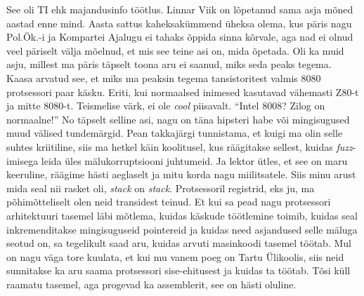 See oli TI ehk majandusinfo töötlus. Linnar Viik on lõpetanud sama asja mõned aastad enne mind. Aasta sattus kaheksakümmend üheksa olema, kus päris nagu Pol.Ök.-i ja Kompartei Ajalugu ei tahaks õppida sinna kõrvale, aga nad ei olnud veel päriselt välja mõelnud, et mis see teine asi on, mida õpetada. Oli ka muid asju, millest ma päris täpselt toona aru ei saanud, miks seda peaks tegema. Kaasa arvatud see, et miks ma peaksin tegema tansistoritest valmis 8080 protsessori paar käsku. Eriti, kui normaalsed inimesed kasutavad vähemasti Z80-t ja mitte 8080-t. Teismelise värk, ei ole \emph{cool} piisavalt. \enquote{Intel 8008? Zilog on normaalne!} No täpselt selline asi, nagu on täna hipsteri habe või mingisugused muud välised tundemärgid. Pean takkajärgi tunnistama, et kuigi ma olin selle suhtes kriitiline, siis ma hetkel käin koolitusel, kus räägitakse sellest, kuidas \emph{fuzz}-imisega leida üles mälukorruptsiooni juhtumeid. Ja lektor ütles, et see on maru  keeruline, räägime hästi aeglaselt ja mitu korda nagu miilitsatele. Siis minu arust mida seal nii rasket oli, \emph{stack} on \emph{stack}. Protsessoril registrid, eks ju, ma põhimõtteliselt olen neid transidest teinud. Et kui sa pead nagu protsessori arhitektuuri tasemel läbi mõtlema, kuidas käskude töötlemine toimib, kuidas seal inkremenditakse mingisuguseid pointereid ja kuidas need asjandused selle mäluga seotud on, sa tegelikult saad aru, kuidas arvuti masinkoodi tasemel töötab. Mul on nagu väga tore kuulata, et kui mu vanem poeg on Tartu Ülikoolis, siis neid sunnitakse ka aru saama protsessori sise-ehitusest ja kuidas ta töötab. Tõsi küll  raamatu tasemel, aga progevad ka assemblerit, see on hästi oluline. 


